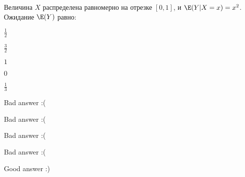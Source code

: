 
\begin{question}
Величина \(X\) распределена равномерно на отрезке \([0,1]\), и
\(\E(Y|X=x)=x^2\). Ожидание \(\E(Y)\) равно:
\begin{answerlist}
  \item \(\frac{1}{2}\)
  \item \(\frac{3}{2}\)
  \item \(1\)
  \item \(0\)
  \item \(\frac{1}{3}\)
\end{answerlist}
\end{question}

\begin{solution}
\begin{answerlist}
  \item Bad answer :(
  \item Bad answer :(
  \item Bad answer :(
  \item Bad answer :(
  \item Good answer :)
\end{answerlist}
\end{solution}

